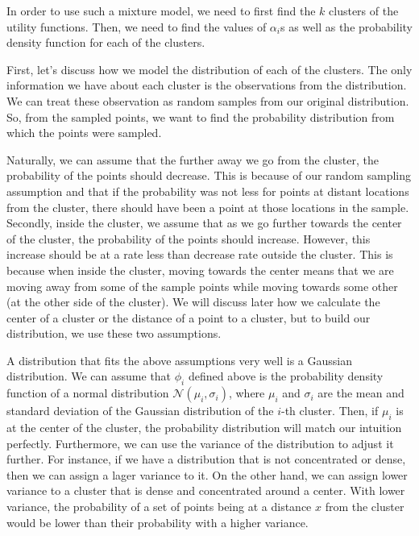 In order to use such a mixture model, we need to first find the $k$ clusters of the utility functions. Then, we need to find the values of $\alpha_i$s as well as the probability density function for each of the clusters.

First, let's discuss how we model the distribution of each of the clusters. The only information we have about each cluster is the observations from the distribution. We can treat these observation as random samples from our original distribution. So, from the sampled points, we want to find the probability distribution from which the points were sampled. 

Naturally, we can assume that the further away we go from the cluster, the probability of the points should decrease. This is because of our random sampling assumption and that if the probability was not less for points at distant locations from the cluster, there should  have been a point at those locations in the sample. Secondly, inside the cluster, we assume that as we go further towards the center of the cluster, the probability of the points should increase. However, this increase should be at a rate less than decrease rate outside the cluster. This is because when inside the cluster, moving towards the center means that we are moving away from some of the sample points while moving towards some other (at the other side of the cluster). We will discuss later how we calculate the center of a cluster or the distance of a point to a cluster, but to build our distribution, we use these two assumptions.  

A distribution that fits the above assumptions very well is a Gaussian distribution. We can assume that $\phi_i$ defined above is the probability density function of a normal distribution $\mathcal{N}(\mu_i, \sigma_i)$, where $\mu_i$ and $\sigma_i$ are the mean and standard deviation of the Gaussian distribution of the $i$-th cluster. Then, if $\mu_i$ is at the center of the cluster, the probability distribution will match our intuition perfectly. Furthermore, we can use the variance of the distribution to adjust it further. For instance, if we have a distribution that is not concentrated or dense, then we can assign a lager variance to it. On the other hand, we can assign lower variance to a cluster that is dense and concentrated around a center. With lower variance, the probability of a set of points being at a distance $x$ from the cluster would be lower than their probability with a higher variance.

